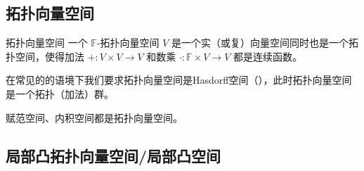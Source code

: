 
\subsection{拓扑向量空间}

\begin{definition}{拓扑向量空间}
一个 $\mathbb{F}$-拓扑向量空间 $V$ 是一个实（或复）向量空间同时也是一个拓扑空间，使得加法 $+: V \times V \to V$ 和数乘 $\cdot: \mathbb{F} \times V \to V$ 都是连续函数。

在常见的的语境下我们要求拓扑向量空间是Hasdorff空间（），此时拓扑向量空间是一个拓扑（加法）群。
\end{definition}

\begin{example}{}
赋范空间、内积空间都是拓扑向量空间。
\end{example}


\subsection{局部凸拓扑向量空间/局部凸空间}





